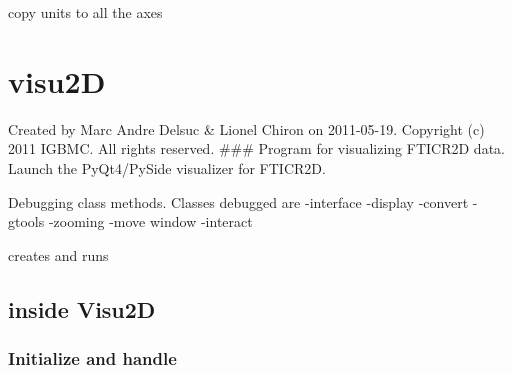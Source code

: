 \documentclass[letterpaper,10pt,openany,oneside]{sphinxmanual}
\begin{document}
\begin{fulllineitems}
\begin{fulllineitems}
\end{fulllineitems}


\begin{fulllineitems}
\label{rst/code:Orbitrap.OrbiData.units}
copy units to all the axes

\end{fulllineitems}


\end{fulllineitems}



\section{visu2D}
\label{rst/code:visu2d}\label{rst/code:module-visu2D}
Created by Marc Andre Delsuc \& Lionel Chiron on 2011-05-19.
Copyright (c) 2011 IGBMC. All rights reserved.
\#\#\#
Program for visualizing FTICR2D data. 
Launch the PyQt4/PySide visualizer for FTICR2D.

\begin{fulllineitems}
\label{rst/code:visu2D.debugs_activate}
Debugging class methods.
Classes debugged are
-interface
-display
-convert
-gtools
-zooming
-move window
-interact

\end{fulllineitems}


\begin{fulllineitems}
\label{rst/code:visu2D.main}
creates and runs

\end{fulllineitems}



\subsection{inside Visu2D}
\label{rst/visu2d:inside-visu2d}\label{rst/visu2d::doc}

\subsubsection{Initialize and handle}
\label{rst/visu2d:initialize-and-handle}
\end{document}
